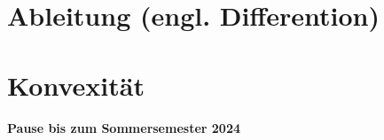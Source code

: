\documentclass[11pt, twoside, a4paper]{article}
\theoremstyle{plain}
\begin{document}
    \newpage


    \section{Ableitung (engl. Differention)}
    


    \section{Konvexität}
    

    \vfill

    \begin{center}
        \textbf{\LARGE Pause bis zum Sommersemester 2024}
    \end{center}

    \vfill
\end{document}
